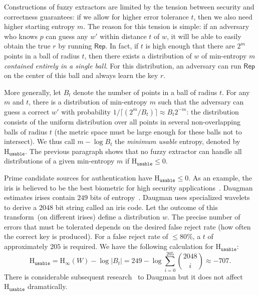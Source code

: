 \documentclass[11pt]{article}
\newcommand{\class}[1]{{\ensuremath{\mathsf{#1}}}}
\newcommand{\rep}{\ensuremath{\class{Rep}}\xspace}
\newcommand{\Hoo}{\mathrm{H}_\infty}
\newcommand{\Huse}{\mathrm{H}_{\mathtt{usable}}}
\begin{document}
Constructions of fuzzy extractors are limited by the tension between security and correctness guarantees: if we allow for higher error tolerance $t$, then we also need higher starting entropy $m$. The reason for this tension is simple: if an adversary who knows $p$ can guess any $w'$ within distance $t$ of $w$, it will be able to easily obtain the true $r$ by running $\rep$.
In fact, if $t$ is high enough that there are $2^m$ points in a ball of radius $t$, then there exists a distribution of $w$ of min-entropy $m$  \emph{contained entirely in a single ball}.  For this distribution, an adversary can run $\rep$ on the center of this ball and always learn the key $r$.

More generally, let $B_t$ denote the number of points in a ball of radius $t$. For any $m$ and $t$, there is a distribution of min-entropy $m$ such that the adversary can guess a correct $w'$ with probability $1/\lceil( 2^m/B_t) \rceil\approx B_t 2^{-m}$: the distribution consists of the uniform distribution over all points in several non-overlapping balls of radius $t$ (the metric space must be large enough for these balls not to intersect). We thus call $m-\log B_t$ the \emph{minimum usable} entropy, denoted by $\Huse$. The previous paragraph shows that  no fuzzy extractor can handle all distributions of a given min-entropy $m$ if  $\Huse\le 0$.

Prime candidate sources for authentication have $\Huse\le 0$.  As an example, the iris is believed to be the best biometric for high security applications~\cite{prabhakar2003biometric}.  Daugman estimates irises contain $249$ bits of entropy~\cite{daugman2004}.  Daugman uses specialized wavelets to derive a $2048$ bit string called an iris code.  Let the outcome of this transform~(on different irises) define a distribution $w$.  The precise number of errors that must be tolerated depends on the desired false reject rate (how often the correct key is produced).  For a false reject rate of $\le 80\%$, a $t$ of approximately $205$ is required.  We have the following calculation for $\Huse$:
\[
\Huse = \Hoo(W) - \log |B_t|
= 249 - \log \sum_{i=0}^{205} {2048 \choose i} \approx -707.
\]
There is considerable subsequent research~\cite{gentile2009slic,gentile2009efficient,rathgeb2011combining} to Daugman but it does not affect $\Huse$ dramatically.%
\end{document}
